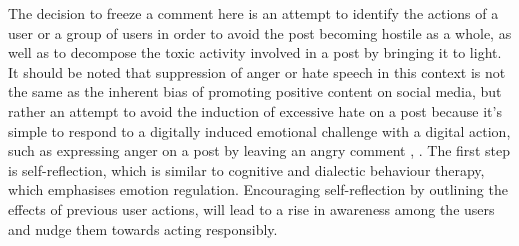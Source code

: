 \documentclass[acmtog]{acmart}
\begin{document}
The decision to freeze a comment here is an attempt to identify the actions of a user or a group of users in order to avoid the post becoming hostile as a whole, as well as to decompose the toxic activity involved in a post by bringing it to light. It should be noted that suppression of anger or hate speech in this context is not the same as the inherent bias of promoting positive content on social media, but rather an attempt to avoid the induction of excessive hate on a post because it's simple to respond to a digitally induced emotional challenge with a digital action, such as expressing anger on a post by leaving an angry comment \cite{wang2021role}, \cite{smith2022digital}. The first step is self-reflection, which is similar to cognitive and dialectic behaviour therapy, which emphasises emotion regulation. Encouraging self-reflection by outlining the effects of previous user actions, will lead to a rise in awareness among the users and nudge them towards acting responsibly. 
\end{document}
